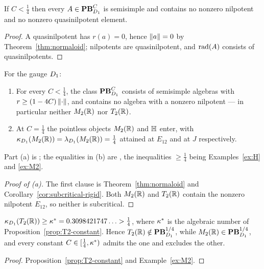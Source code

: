 \begin{corollary}\label{cor:subcritical-rigid}
If $C<\tfrac14$ then every $A\in\mathbf{PB}^C_{D_1}$ is semisimple and contains no
nonzero nilpotent and no nonzero quasinilpotent element.
\end{corollary}

\begin{proof}
A quasinilpotent has $r(a)=0$, hence $\left\lVert a\right\rVert=0$ by
Theorem~\ref{thm:normaloid}; nilpotents are quasinilpotent, and $\operatorname{rad}(A)$
consists of quasinilpotents.
\end{proof}

\begin{theorem}\label{thm:phase-transition}
For the gauge $D_1$:
\begin{enumerate}
\item[(a)] For every $C<\tfrac14$, the class $\mathbf{PB}^C_{D_1}$ consists of
  semisimple algebras with $r\ge(1-4C)\left\lVert\cdot\right\rVert$, and contains no algebra
  with a nonzero nilpotent --- in particular neither $M_2(\mathbb{R})$ nor $T_2(\mathbb{R})$.
\item[(b)] At $C=\tfrac14$ the pointless objects $M_2(\mathbb{R})$ and $\mathbb{H}$ enter,
  with $\kappa_{D_1}(M_2(\mathbb{R}))=\lambda_{D_1}(M_2(\mathbb{R}))=\tfrac14$ attained
  at $E_{12}$ and at $J$ respectively.
\end{enumerate}
Part (a) is \statusproved; the equalities in (b) are \statusnum, the
inequalities $\ge\tfrac14$ being Examples~\ref{ex:H} and \ref{ex:M2}.
\end{theorem}

\begin{proof}[Proof of (a)]
The first clause is Theorem~\ref{thm:normaloid} and
Corollary~\ref{cor:subcritical-rigid}.  Both $M_2(\mathbb{R})$ and $T_2(\mathbb{R})$ contain
the nonzero nilpotent $E_{12}$, so neither is subcritical.
\end{proof}

\begin{theorem}
\label{thm:constant-separates}
$\kappa_{D_1}(T_2(\mathbb{R}))\ge\kappa^*=0.3098421747\ldots>\tfrac14$, where
$\kappa^*$ is the algebraic number of Proposition~\ref{prop:T2-constant}.  Hence
$T_2(\mathbb{R})\notin\mathbf{PB}^{1/4}_{D_1}$, while $M_2(\mathbb{R})\in\mathbf{PB}^{1/4}_{D_1}$,
and every constant $C\in[\tfrac14,\kappa^*)$ admits the one and excludes the
other.
\end{theorem}

\begin{proof}
Proposition~\ref{prop:T2-constant} and Example~\ref{ex:M2}.
\end{proof}

